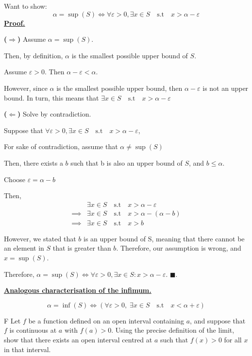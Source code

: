 \documentclass[]{article}
\begin{document}
Want to show:
\[
    \alpha = \sup(S) \iff \forall \varepsilon > 0, \exists x \in S \quad \text{s.t} \quad x > \alpha - \varepsilon
\]
\underline{\textbf{Proof.}}  

\medskip

\noindent \textbf{($\Rightarrow$)}  
Assume $\alpha = \sup(S)$.  

Then, by definition, $\alpha$ is the smallest possible upper bound of $S$.

Assume $\varepsilon > 0$. Then $\alpha - \varepsilon < \alpha$. 

However, since $\alpha$ is the smallest possible upper bound, then $\alpha - \varepsilon$ is not an upper bound. In turn, this means that
$\exists x \in S \quad \text{s.t} \quad x > \alpha - \varepsilon$


\medskip

\noindent \textbf{($\Leftarrow$)}  
Solve by contradiction.

Suppose that $\forall\varepsilon>0,\exists x \in S \quad \text{s.t} \quad x > \alpha - \varepsilon$,

For sake of contradiction, assume that $\alpha \ne \sup(S)$

Then, there exists a $b$ such that b is also an upper bound of $S$, and $b \le \alpha$.

Choose $\varepsilon = \alpha - b$

Then, 
\begin{align*}
    &\exists x \in S \quad \text{s.t} \quad x > \alpha - \varepsilon \\
    \implies&\exists x \in S \quad \text{s.t} \quad x > \alpha - (\alpha - b) \\
    \implies&\exists x \in S \quad \text{s.t} \quad x > b
\end{align*}

However, we stated that $b$ is an upper bound of S, meaning that there cannot be an element in $S$ that is
greater than $b$. Therefore, our assumption is wrong, and $x = \sup(S)$.

\medskip

Therefore, $\alpha = \sup(S) \iff \forall \varepsilon > 0, \exists x \in S : x > \alpha - \varepsilon$. $\blacksquare$.


\medskip

\underline{\textbf{Analogous characterisation of the infimum.}}

\[
    \alpha = \inf(S) \iff (\forall \varepsilon > 0,\; \exists x \in S \quad \text{s.t} \quad x < \alpha + \varepsilon)
\]
\begin{question}{F}
      Let $f$ be a function defined on an open interval containing $a$, and
suppose that $f$ is continuous at $a$ with $f(a) > 0$. Using the precise
definition of the limit, show that there exists an open interval centred
at $a$ such that $f(x) > 0$ for all $x$ in that interval.


\end{question}      
\end{document}
